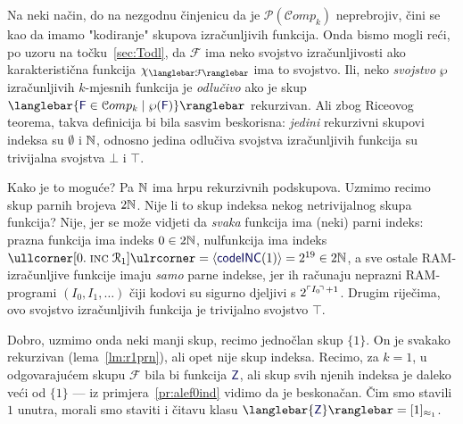 Na neki način, do na nezgodnu činjenicu da je $\mathcal P(\mathcal Comp_k)$ neprebrojiv, čini se kao da imamo "kodiranje" skupova izračunljivih funkcija. Onda bismo mogli reći, po uzoru na točku~\ref{sec:Todl}, da $\mathcal F$ ima neko svojstvo izračunljivosti ako karakteristična funkcija $\chi_{\knk{\mathcal F}}$ ima to svojstvo. Ili, neko \emph{svojstvo} $\wp$ izračunljivih $k$-mjesnih funkcija je \emph{odlučivo} ako je skup $\knk{\{\f F\in\mathcal Comp_k\mid\wp(\f F)\}}$ rekurzivan. Ali zbog Riceovog teorema, takva definicija bi bila sasvim beskorisna: \emph{jedini} rekurzivni skupovi indeksa su $\emptyset$ i ${\mathbb N}$, odnosno jedina odlučiva svojstva izračunljivih funkcija su trivijalna svojstva $\bot$ i $\top$.


Kako je to moguće? Pa ${\mathbb N}$ ima hrpu rekurzivnih podskupova. Uzmimo recimo skup parnih brojeva $2{\mathbb N}$. Nije li to skup indeksa nekog netrivijalnog skupa funkcija? Nije, jer se može vidjeti da \emph{svaka} funkcija ima (neki) parni indeks: prazna funkcija ima indeks $0\in2{\mathbb N}$, nulfunkcija ima indeks $\kprog{[0.\;\incr1]}=\kr{\f{codeINC}(1)}=2^{19}\in2\N$, a sve ostale RAM-izračunljive funkcije imaju \emph{samo} parne indekse, jer ih računaju neprazni RAM-programi $(I_0,I_1,\dotsc)$ čiji kodovi su sigurno djeljivi s $2^{\ulcorner I_0\!\urcorner\,+1}$. Drugim riječima, ovo svojstvo izračunljivih funkcija je trivijalno svojstvo $\top$.

Dobro, uzmimo onda neki manji skup, recimo jednočlan skup $\{1\}$. On je svakako rekurzivan (lema~\ref{lm:r1prn}), ali opet nije skup indeksa. Recimo, za $k=1$, u odgovarajućem skupu $\mathcal F$ bila bi funkcija $\f Z$, ali skup svih njenih indeksa je daleko veći od $\{1\}$ --- iz primjera~\ref{pr:alef0ind} vidimo da je beskonačan. Čim smo stavili $1$ unutra, morali smo staviti i čitavu klasu $\knk{\{\f Z\}}=[1]_{\approx_1}$.


